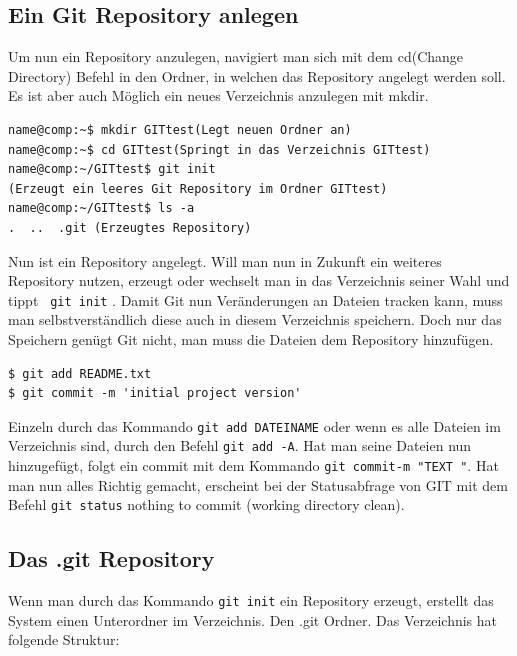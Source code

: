 \documentclass[12pt,a4paper,bibliography=totocnumbered,listof=totocnumbered]{scrartcl}
\begin{document}
\subsection{Ein Git Repository anlegen}
Um nun ein Repository anzulegen, navigiert man sich mit dem cd(Change Directory) Befehl in den Ordner, in welchen das Repository angelegt werden soll. Es ist aber auch Möglich ein neues Verzeichnis anzulegen mit mkdir. 

\vspace{1em}
\begin{lstlisting}[caption=Git Repository anlegen, label=lst:arduino]
name@comp:~$ mkdir GITtest(Legt neuen Ordner an)
name@comp:~$ cd GITtest(Springt in das Verzeichnis GITtest)
name@comp:~/GITtest$ git init 
(Erzeugt ein leeres Git Repository im Ordner GITtest)
name@comp:~/GITtest$ ls -a
.  ..  .git (Erzeugtes Repository)

\end{lstlisting}

Nun ist ein Repository angelegt.
Will man nun in Zukunft ein weiteres Repository nutzen, erzeugt oder wechselt man in das Verzeichnis seiner Wahl und tippt  \lstinline| git init| . Damit Git nun Veränderungen an Dateien tracken kann, muss man selbstverständlich diese auch in diesem Verzeichnis speichern. Doch nur das Speichern genügt Git nicht, man muss die Dateien dem Repository hinzufügen. 

 \vspace{1em}
\begin{lstlisting}[caption=Git Repository Dateien hinzufügen, label=lst:arduino]
$ git add README.txt
$ git commit -m 'initial project version'

\end{lstlisting}


Einzeln durch das Kommando \lstinline|git add DATEINAME| oder wenn es alle Dateien im Verzeichnis sind, durch den Befehl \lstinline|git add -A|. Hat man seine Dateien nun hinzugefügt, folgt ein commit mit dem Kommando \lstinline|git commit-m "TEXT "|. Hat man nun alles Richtig gemacht, erscheint bei der Statusabfrage von GIT mit dem Befehl \lstinline|git status| nothing to commit (working directory clean).

\subsection{Das .git Repository}
Wenn man durch das Kommando \lstinline|git init|	ein Repository erzeugt, erstellt das System einen Unterordner im Verzeichnis. Den .git Ordner. Das Verzeichnis hat folgende Struktur:
\end{document}

